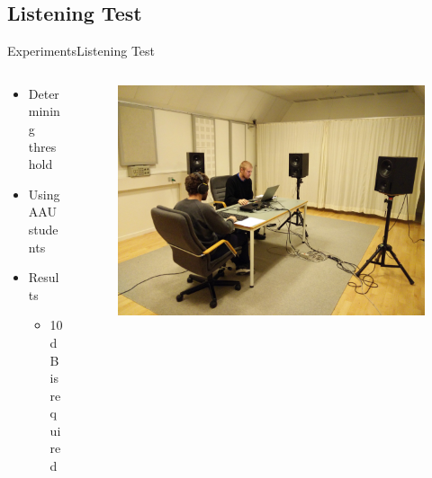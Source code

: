 \subsection{Listening Test}
\begin{frame}{Experiments}{Listening Test}		
	\begin{columns}
		\begin{column}{0.5\textwidth}
			\begin{itemize}
				\item Determining threshold
				\item Using AAU students
				\item Results
				\begin{itemize}
					\item 10 dB is required
				\end{itemize}
			\end{itemize}	
		\end{column}	
		\begin{column}{0.5\textwidth} 
			\begin{figure}
					\includegraphics[width=1\textwidth]{figures/ListeningTestSetup.jpg}
			\end{figure}
		\end{column}
	\end{columns}
\end{frame}

